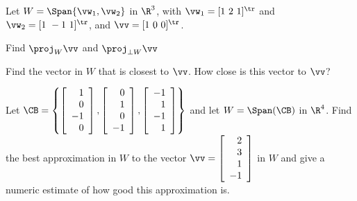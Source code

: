 \label{sec:gram_schmidt_exercises}
\be
\item Let $W = \Span \{\vw_1, \vw_2\}$ in $\R^3$, with $\vw_1=[1 \ 2 \ 1]^{\tr}$ and $\vw_2= [1 \ -1 \ 1]^{\tr}$,  and  $\vv = [1 \ 0 \ 0]^{\tr}$. 
	\ba
	\item Find $\proj_W \vv$ and $\proj_{\perp W} \vv$

	\item Find the vector in $W$ that is closest to $\vv$. How close is this vector to $\vv$? 

	\ea


\item Let $\CB = \left\{\left[ \begin{array}{r} 1 \\ 0 \\ -1 \\ 0 \end{array} \right], \left[ \begin{array}{r} 0 \\ 1 \\ 0 \\ -1 \end{array} \right], \left[ \begin{array}{r} -1 \\ 1 \\ -1 \\ 1 \end{array} \right]\right\}$ and let $W = \Span(\CB)$ in $\R^4$. Find the best approximation in $W$ to the vector $\vv = \left[ \begin{array}{r} 2 \\ 3 \\ 1 \\ -1 \end{array} \right]$ in $W$ and give a numeric estimate of how good this approximation is.
	
